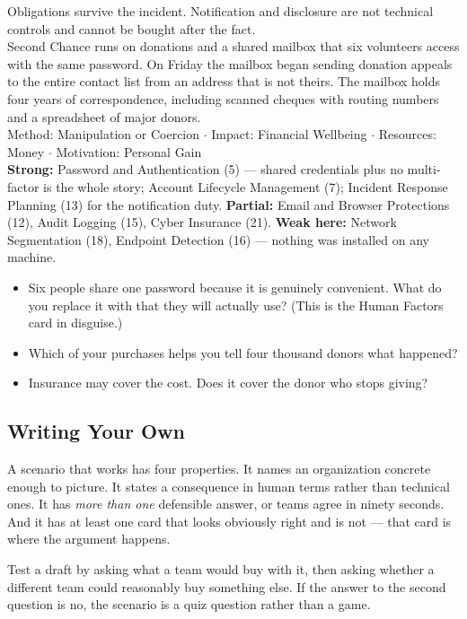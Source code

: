  Obligations survive the incident. Notification and
disclosure are not technical controls and cannot be bought after the fact.\\
 Second Chance runs on donations and a shared mailbox that six
volunteers access with the same password. On Friday the mailbox began sending
donation appeals to the entire contact list from an address that is not theirs.
The mailbox holds four years of correspondence, including scanned cheques with
routing numbers and a spreadsheet of major donors.\\
 Method: Manipulation or Coercion $\cdot$ Impact: Financial
Wellbeing $\cdot$ Resources: Money $\cdot$ Motivation: Personal Gain\\
 \textbf{Strong:} Password and Authentication (5) --- shared
credentials plus no multi-factor is the whole story; Account Lifecycle
Management (7); Incident Response Planning (13) for the notification duty.
\textbf{Partial:} Email and Browser Protections (12), Audit Logging (15), Cyber
Insurance (21). \textbf{Weak here:} Network Segmentation (18), Endpoint Detection
(16) --- nothing was installed on any machine.\\
\begin{itemize}
\item Six people share one password because it is genuinely convenient. What do
you replace it with that they will actually use? (This is the Human Factors card
in disguise.)
\item Which of your purchases helps you tell four thousand donors what happened?
\item Insurance may cover the cost. Does it cover the donor who stops giving?
\end{itemize}

\vspace{1.2em}
\subsection*{Writing Your Own}

A scenario that works has four properties. It names an organization concrete
enough to picture. It states a consequence in human terms rather than technical
ones. It has \emph{more than one} defensible answer, or teams agree in ninety
seconds. And it has at least one card that looks obviously right and is not ---
that card is where the argument happens.

Test a draft by asking what a team would buy with it, then asking whether a
different team could reasonably buy something else. If the answer to the second
question is no, the scenario is a quiz question rather than a game.
